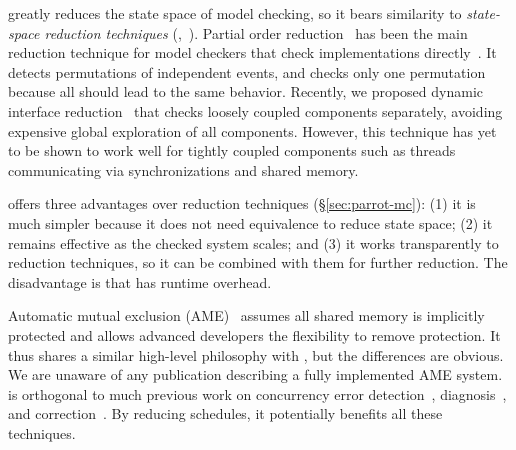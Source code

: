  \parrot greatly reduces the state space of
model checking, so it bears similarity to \emph{state-space reduction
  techniques} (\eg,~\cite{godefroid:verisoft, flanagan:dynamicpo,
  demeter:sosp11}).  Partial order
reduction~\cite{godefroid:verisoft, flanagan:dynamicpo} has been the main
reduction technique for model checkers that check implementations
directly~\cite{modist:nsdi09, dbug:spin11}.  It detects
permutations of independent events, and checks only one permutation
because all should lead to the same behavior.  Recently, we proposed
dynamic interface reduction~\cite{demeter:sosp11} that checks loosely
coupled components separately, avoiding expensive global exploration of
all components.  However, this technique has yet to be shown to work well
for tightly coupled components such as threads communicating
via synchronizations and shared memory.

\parrot offers three advantages over reduction techniques
(\S\ref{sec:parrot-mc}): (1) it is much simpler because it does not
need equivalence to reduce state space; (2) it remains effective as the
checked system scales; and (3) it works transparently to reduction
techniques, so it can be combined with them for further reduction.  The
disadvantage is that \parrot has runtime overhead.

 Automatic mutual exclusion (AME)~\cite{ame:hotos07} assumes 
all shared
memory is implicitly protected and allows advanced developers the
flexibility to remove protection.  It thus shares a similar high-level
philosophy with \parrot, but the differences are obvious.  We are unaware of
any publication describing a fully implemented AME system. \parrot is
orthogonal to much previous work on concurrency error
detection~\cite{yu:racetrack:sosp,savage:eraser,racerx:sosp03,lu:muvi:sosp,
avio:asplos06,conmem:asplos10},
diagnosis~\cite{racefuzzer:pldi08,ctrigger:asplos09,atomfuzzer:fse08}, and
correction~\cite{dimmunix:osdi08,gadara:osdi08,wu:loom:osdi10,cfix:osdi12}. By
reducing schedules, it potentially benefits all these techniques.
